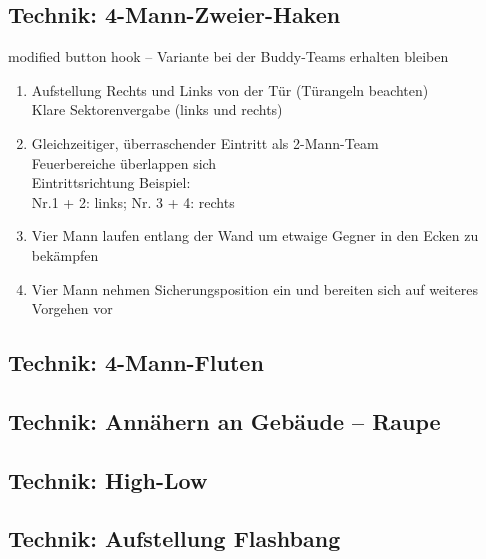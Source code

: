 \subsection{Technik: 4-Mann-Zweier-Haken}
\begin{center}
	modified button hook -- Variante bei der Buddy-Teams erhalten bleiben
\end{center}
	\begin{enumerate}
		\item Aufstellung Rechts und Links von der Tür (Türangeln beachten) \\
		Klare Sektorenvergabe (links und rechts)
		\item Gleichzeitiger, überraschender Eintritt als 2-Mann-Team \\
		Feuerbereiche überlappen sich \\
		Eintrittsrichtung Beispiel: \\
		Nr.1 + 2: links; Nr. 3 + 4: rechts
		\item Vier Mann laufen entlang der Wand um etwaige Gegner in den Ecken zu bekämpfen
		\item Vier Mann nehmen Sicherungsposition ein und bereiten sich auf weiteres Vorgehen vor
	\end{enumerate}      
\subsection{Technik: 4-Mann-Fluten}
\subsection{Technik: Annähern an Gebäude -- Raupe}
\subsection{Technik: High-Low}
\subsection{Technik: Aufstellung Flashbang}